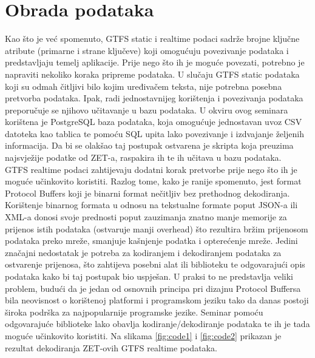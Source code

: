 \documentclass[seminarskirad]{fer}
\begin{document}
\section{Obrada podataka}
\label{pog:obrada}
Kao što je već spomenuto, GTFS static i realtime podaci sadrže brojne ključne atribute (primarne i strane ključeve) koji omogućuju povezivanje podataka i predstavljaju temelj aplikacije. Prije nego što ih je moguće povezati, potrebno je napraviti nekoliko koraka pripreme podataka. U slučaju GTFS static podataka koji su odmah čitljivi bilo kojim uređivačem teksta, nije potrebna posebna pretvorba podataka. Ipak, radi jednostavnijeg korištenja i povezivanja podataka preporučuje se njihovo učitavanje u bazu podataka. U okviru ovog seminara korištena je PostgreSQL baza podataka, koja omogućuje jednostavan uvoz CSV datoteka kao tablica te pomoću SQL upita lako povezivanje i izdvajanje željenih informacija. Da bi se olakšao taj postupak ostvarena je skripta koja preuzima najsvježije podatke od ZET-a, raspakira ih te ih učitava u bazu podataka.\\
GTFS realtime podaci zahtijevaju dodatni korak pretvorbe prije nego što ih je moguće učinkovito koristiti. Razlog tome, kako je ranije spomenuto, jest format Protocol Buffers koji je binarni format nečitljiv bez prethodnog dekodiranja. Korištenje binarnog formata u odnosu na tekstualne formate poput JSON-a ili XML-a donosi svoje prednosti poput zauzimanja znatno manje memorije za prijenos istih podataka (ostvaruje manji overhead) što rezultira bržim prijenosom podataka preko mreže, smanjuje kašnjenje podatka i opterećenje mreže. Jedini značajni nedostatak je potreba za kodiranjem i dekodiranjem podataka za ostvarenje prijenosa, što zahtijeva posebni alat ili biblioteku te odgovarajući opis podataka kako bi taj postupak bio uspješan. U praksi to ne predstavlja veliki problem, budući da je jedan od osnovnih principa pri dizajnu Protocol Buffersa bila neovisnost o korištenoj platformi i programskom jeziku tako da danas postoji široka podrška za najpopularnije programske jezike. Seminar pomoću odgovarajuće biblioteke lako obavlja kodiranje/dekodiranje podataka te ih je tada moguće učinkovito koristiti. Na slikama \ref{fig:code1} i \ref{fig:code2} prikazan je rezultat dekodiranja ZET-ovih GTFS realtime podataka.
\end{document}
